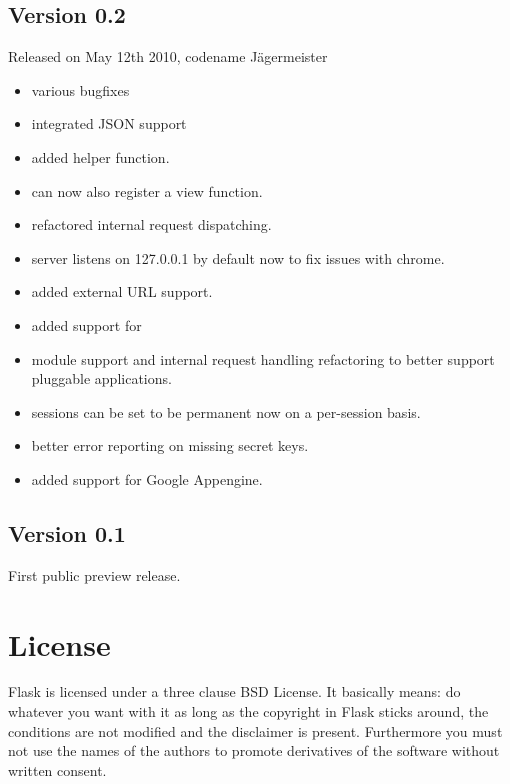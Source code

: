 \documentclass[a4paper,12pt]{sphinxmanual}
\begin{document}
\section{Version 0.2}
\label{changelog:version-0-2}
Released on May 12th 2010, codename Jägermeister
\begin{itemize}
\item {} 
various bugfixes

\item {} 
integrated JSON support

\item {} 
added {\hyperref[api:flask.get_template_attribute]{}} helper function.

\item {} 
{\hyperref[api:flask.Flask.add_url_rule]{}} can now also register a
view function.

\item {} 
refactored internal request dispatching.

\item {} 
server listens on 127.0.0.1 by default now to fix issues with chrome.

\item {} 
added external URL support.

\item {} 
added support for {\hyperref[api:flask.send_file]{}}

\item {} 
module support and internal request handling refactoring
to better support pluggable applications.

\item {} 
sessions can be set to be permanent now on a per-session basis.

\item {} 
better error reporting on missing secret keys.

\item {} 
added support for Google Appengine.

\end{itemize}


\section{Version 0.1}
\label{changelog:version-0-1}
First public preview release.


\chapter{License}
\label{license::doc}\label{license:license}
Flask is licensed under a three clause BSD License.  It basically means:
do whatever you want with it as long as the copyright in Flask sticks
around, the conditions are not modified and the disclaimer is present.
Furthermore you must not use the names of the authors to promote derivatives
of the software without written consent.
\end{document}
